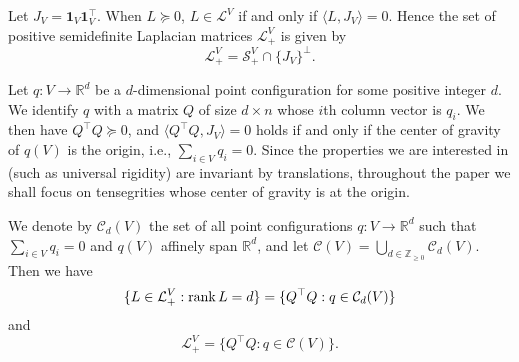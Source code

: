 \documentclass[11pt]{article}
\theoremstyle{definition}
\begin{document}
Let $J_V={\bm 1}_V {\bm 1}_V^{\top}$.
When $L\succeq 0$, $L\in \mathcal{L}^V$ if and only if  $\langle L, J_V\rangle=0$.
Hence the set of positive semidefinite Laplacian matrices  $\mathcal{L}_+^V$ is given by 
\[
\mathcal{L}_+^V=\mathcal{S}_+^V\cap \{J_V\}^{\bot}. 
\]

Let $q:V\rightarrow \mathbb{R}^d$ be a $d$-dimensional point configuration for some positive integer $d$. 
We identify $q$ with a matrix $Q$ of size $d\times n$ whose $i$th column vector is $q_i$. 
We then have $Q^{\top} Q\succeq 0$, 
and $\langle Q^\top Q, J_V \rangle = 0$ holds if and only if the center of gravity of $q(V)$ is the origin, i.e., $\sum_{i\in V} q_i=0$. 
Since the properties we are interested in (such as universal rigidity) are invariant by translations, 
throughout the paper we shall focus on tensegrities whose  center of gravity is at the origin.

We denote by $\mathcal{C}_d(V)$ the set of all point configurations $q:V\rightarrow \mathbb{R}^d$ such that $\sum_{i\in V} q_i=0$ and $q(V)$ affinely span $\mathbb{R}^d$,
and let $\mathcal{C}(V)=\bigcup_{d\in \mathbb{Z}_{\geq 0}} \mathcal{C}_d(V)$. 
Then we have  
\begin{equation}\label{eq:conf2}
\{L\in \mathcal{L}^V_+: \rank L=d\}=\{Q^{\top} Q: q\in \mathcal{C}_d(V)\}
\end{equation}
and 
\begin{equation}\label{eq:conf}
\mathcal{L}^V_+=\{Q^{\top} Q: q\in \mathcal{C}(V)\}.
\end{equation}
\end{document}
